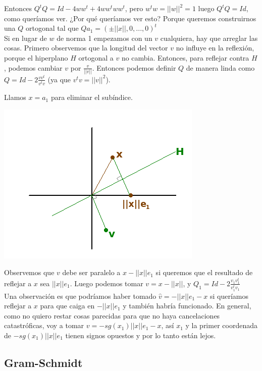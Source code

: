 \documentclass[10pt,a4paper,final]{report}
\begin{document}
{Entonces $Q^t Q = Id - 4 w w^t + 4 w w^t w w^t$, pero $w^t w=||w||^2 = 1$ luego $Q^t Q = Id$, como queríamos ver. ¿Por qué queríamos ver esto? Porque queremos construirnos una $Q$ ortogonal tal que $Qa_1 = (\pm ||x||,0,...,0)^t$\\

Si en lugar de $w$ de norma 1 empezamos con un $v$ cualquiera, hay que arreglar las cosas. Primero observemos que la longitud del vector $v$ no influye en la reflexión, porque el hiperplano $H$ ortogonal a $v$ no cambia. Entonces, para reflejar contra $H$, podemos cambiar $v$ por $\frac{v}{||v||}$. Entonces podemos definir $Q$ de manera linda como $Q = Id - 2 \frac{v v^t}{v^t v}$ (ya que $v^t v = ||v||^2$).

Llamos $x=a_1$ para eliminar el subíndice.

\includegraphics[scale=1]{householder3.png}

Observemos que $v$ debe ser paralelo a $x-||x||e_1$ si queremos que el resultado de reflejar a $x$ sea $||x||e_1$. Luego podemos tomar $v=x-||x||$, y $Q_1 = Id - 2 \frac{v_1 v_1^t}{v_1^t v_1}$\\

Una observación es que podríamos haber tomado $\hat{v} = - ||x||e_1 -x$ si queríamos reflejar a $x$ para que caiga en $-||x||e_1$ y también habría funcionado. En general, como no quiero restar cosas parecidas para que no haya cancelaciones catastróficas, voy a tomar $v= -sg(x_1)||x||e_1-x$, así $x_1$ y la primer coordenada de $-sg(x_1)||x||e_1$ tienen signos opuestos y por lo tanto están lejos.

\subsection*{Gram-Schmidt}

}
\end{document}
